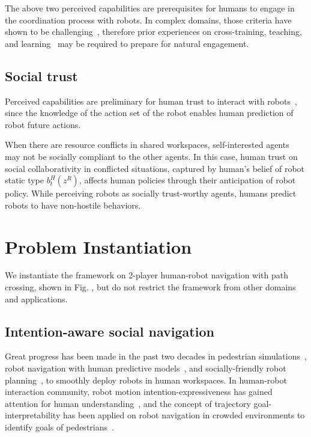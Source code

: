 \documentclass[letterpaper, 10 pt, conference]{ieeeconf}  %
\begin{document}
The above two perceived capabilities are prerequisites for humans to engage in the 
coordination process with robots. In complex domains, those criteria have shown to be 
challenging~\cite{knepper2017implicit}, therefore prior experiences on 
cross-training, teaching, and learning~\cite{zhang2017plan} may be required 
to prepare for natural engagement. 
\subsection{Social trust}%
Perceived capabilities are preliminary for human trust to interact with 
robots~\cite{yang2017evaluating}, since the knowledge of the action set of the robot enables 
human prediction of robot future actions.

When there are resource conflicts in shared workspaces, 
self-interested agents may not be socially compliant to the other agents. 
In this case, human trust on social collaborativity in conflicted situations, 
captured by human's belief of robot static type $b^H_t(z^R)$, 
affects human policies through their anticipation of robot policy. While 
perceiving robots as socially 
trust-worthy agents, humans predict robots to have non-hostile behaviors.   

\section{Problem Instantiation}

We instantiate the framework on 2-player human-robot navigation with path 
crossing, shown in Fig. , but do not restrict the framework from other domains 
and applications.

\subsection{Intention-aware social navigation}
Great progress has been made in the past two decades in pedestrian simulations~\cite{karamouzas2009predictive,treuille2006continuum}, robot navigation with human predictive models~\cite{trautman2010unfreezing,kuderer2012feature}, and 
socially-friendly robot 
planning~\cite{mavrogiannis2016decentralized,chen2017socially}, to smoothly 
deploy robots in human workspaces. In human-robot interaction community, 
robot motion intention-expressiveness has gained attention for human 
understanding~\cite{dragan2013legibility}, and the concept of trajectory 
goal-interpretability has been applied on robot navigation in crowded 
environments to identify goals of pedestrians~\cite{bai2015intention,unhelkar2015human}. 
\end{document}
